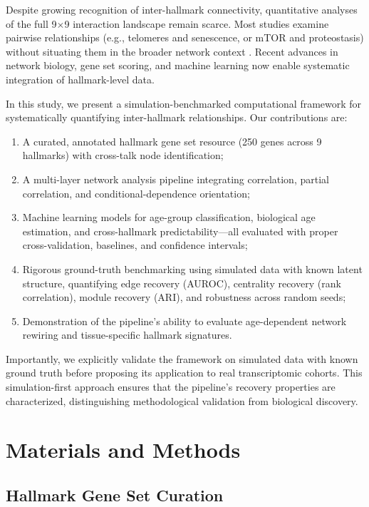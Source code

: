 \documentclass[11pt,a4paper]{article}
\begin{document}
Despite growing recognition of inter-hallmark connectivity, quantitative analyses of the full 9$\times$9 interaction landscape remain scarce. Most studies examine pairwise relationships (e.g., telomeres and senescence, or mTOR and proteostasis) without situating them in the broader network context \citep{gladyshev2021molecular}. Recent advances in network biology, gene set scoring, and machine learning now enable systematic integration of hallmark-level data.

In this study, we present a simulation-benchmarked computational framework for systematically quantifying inter-hallmark relationships. Our contributions are:
\begin{enumerate}[noitemsep]
    \item A curated, annotated hallmark gene set resource (250 genes across 9 hallmarks) with cross-talk node identification;
    \item A multi-layer network analysis pipeline integrating correlation, partial correlation, and conditional-dependence orientation;
    \item Machine learning models for age-group classification, biological age estimation, and cross-hallmark predictability---all evaluated with proper cross-validation, baselines, and confidence intervals;
    \item Rigorous ground-truth benchmarking using simulated data with known latent structure, quantifying edge recovery (AUROC), centrality recovery (rank correlation), module recovery (ARI), and robustness across random seeds;
    \item Demonstration of the pipeline's ability to evaluate age-dependent network rewiring and tissue-specific hallmark signatures.
\end{enumerate}

Importantly, we explicitly validate the framework on simulated data with known ground truth before proposing its application to real transcriptomic cohorts. This simulation-first approach ensures that the pipeline's recovery properties are characterized, distinguishing methodological validation from biological discovery.

\section{Materials and Methods}

\subsection{Hallmark Gene Set Curation}
\end{document}
